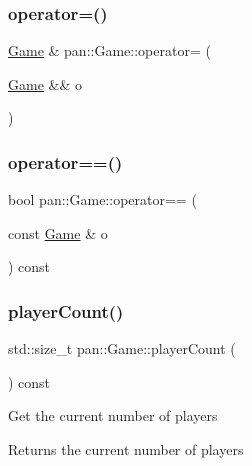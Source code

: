 \mbox{\label{classpan_1_1_game_a6e3665ea2ec133ed5ba0beefadbe688d}} 
\subsubsection{\texorpdfstring{operator=()}{operator=()}\hspace{0.1cm}{\footnotesize\ttfamily [2/2]}}
{\footnotesize\ttfamily \hyperlink{classpan_1_1_game}{Game} \& pan\+::\+Game\+::operator= (\begin{DoxyParamCaption}\item[{\hyperlink{classpan_1_1_game}{Game} \&\&}]{o }\end{DoxyParamCaption})}

\mbox{\label{classpan_1_1_game_a674b783428470d9831cfa79bca8fe0c9}} 
\subsubsection{\texorpdfstring{operator==()}{operator==()}}
{\footnotesize\ttfamily bool pan\+::\+Game\+::operator== (\begin{DoxyParamCaption}\item[{const \hyperlink{classpan_1_1_game}{Game} \&}]{o }\end{DoxyParamCaption}) const}

\mbox{\label{classpan_1_1_game_abd867b6b03f12c8b3aa8ccaef62a9cce}} 
\subsubsection{\texorpdfstring{player\+Count()}{playerCount()}}
{\footnotesize\ttfamily std\+::size\+\_\+t pan\+::\+Game\+::player\+Count (\begin{DoxyParamCaption}{ }\end{DoxyParamCaption}) const\hspace{0.3cm}{\ttfamily [inline]}}

Get the current number of players \begin{DoxyReturn}{Returns}
the current number of players 
\end{DoxyReturn}
\mbox{\label{classpan_1_1_game_aaefd820a874069810f2e62a2d50068e1}} 
